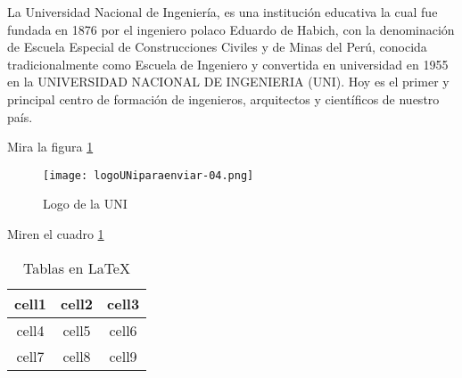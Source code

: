 \documentclass[12pt,a4paper]{article}
\begin{document}
\listoftables
\listoffigures
\newpage
\begin{multicols}{2}
La Universidad Nacional de Ingeniería, es una institución educativa la cual fue fundada en 1876 por el ingeniero polaco Eduardo de Habich, con la denominación de Escuela Especial de Construcciones Civiles y de Minas del Perú, conocida tradicionalmente como Escuela de Ingeniero y convertida en universidad en 1955 en la UNIVERSIDAD NACIONAL DE INGENIERIA (UNI). Hoy es el primer y principal centro de formación de ingenieros, arquitectos y científicos de nuestro país.
\end{multicols}
Mira la figura \ref{figura1}
\begin{figure}[h]
    \centering
\texttt{[image: logoUNiparaenviar-04.png]}
\caption{Logo de la UNI\label{figura1}}
\end{figure}
\newpage
Miren el cuadro \ref{tabla1}
\begin{table}[h]
\begin{center}
\begin{tabular}{ ||c|c|c|| } 
 \hline
 cell1 & cell2 & cell3 \\ [0.5ex] 
  \hline  \hline  %
 cell4 & cell5 & cell6 \\ 
 cell7 & cell8 & cell9 \\ 
 \hline
\end{tabular}
\caption{Tablas en \LaTeX \label{tabla1}}
\end{center}
\end{table}
\end{document}
